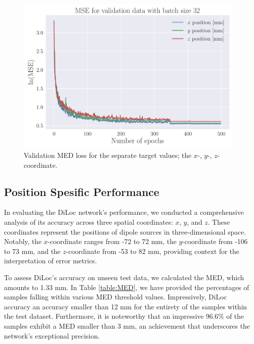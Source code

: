 \documentclass[a4paper, UKenglish, 11pt]{uiomaster}
\begin{document}
\begin{figure}[!htb]
    \centering
    \includegraphics[width=\linewidth]{figures/mse_targets_simple_32_0.001_0.35_0.5_0.0_500_(0).pdf}
    \caption{Validation MED loss for the separate target values; the $x$-, $y$-, $z$-coordinate.}
    \label{fig:single_dipole_accuracy_targets}
\end{figure}


\subsection{Position Spesific Performance}
In evaluating the DiLoc network's performance, we conducted a comprehensive analysis of its accuracy across three spatial coordinates: $x$, $y$, and $z$. These coordinates represent the positions of dipole sources in three-dimensional space. Notably, the $x$-coordinate ranges from -72 to 72 mm, the $y$-coordinate from -106 to 73 mm, and the $z$-coordinate from -53 to 82 mm, providing context for the interpretation of error metrics.

To assess DiLoc's accuracy on unseen test data, we calculated the MED, which amounts to 1.33 mm. In Table \ref{table:MED}, we have provided the percentages of samples falling within various MED threshold values. Impressively, DiLoc accuracy an accuracy smaller than 12 mm for the entirety of the samples within the test dataset. Furthermore, it is noteworthy that an impressive 96.6$\%$ of the samples exhibit a MED smaller than 3 mm, an achievement that underscores the network's exceptional precision.
\end{document}
